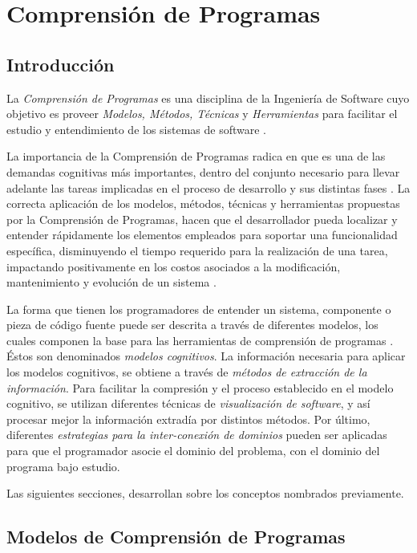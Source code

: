 \chapter{Comprensión de Programas}

\section{Introducción}

La \textit{Comprensión de Programas} es una disciplina de la Ingeniería de Software
cuyo objetivo es proveer \textit{Modelos, Métodos, Técnicas} y \textit{Herramientas}
para facilitar el estudio y entendimiento de los sistemas de software \cite{BeronHenriquesPereira10}.

La importancia de la Comprensión de Programas radica en que es una de las demandas cognitivas
más importantes, dentro del conjunto necesario para llevar adelante las tareas implicadas
en el proceso de desarrollo y sus distintas fases \cite{PetreDeQuincey06}.
La correcta aplicación de los modelos, métodos, técnicas y herramientas propuestas por
la Comprensión de Programas, hacen que el desarrollador pueda localizar y entender rápidamente
los elementos empleados para soportar una funcionalidad específica, disminuyendo el tiempo requerido
para la realización de una tarea, impactando positivamente en los costos asociados a la
modificación, mantenimiento y evolución de un sistema \cite{BeronHenriquesPereira10}.

La forma que tienen los programadores de entender un sistema, componente o pieza de código fuente
puede ser descrita a través de diferentes modelos, los cuales componen la base para las herramientas
de comprensión de programas \cite{BeronHenriquesPereiraUzal07}.
Éstos son denominados \textit{modelos cognitivos}.
La información necesaria para aplicar los modelos cognitivos, se obtiene a través de
\textit{métodos de extracción de la información}.
Para facilitar la compresión y el proceso establecido en el modelo cognitivo, se utilizan
diferentes técnicas de \textit{visualización de software}, y así procesar mejor la
información extradía por distintos métodos.
Por último, diferentes \textit{estrategias para la inter-conexión de dominios} pueden ser
aplicadas para que el programador asocie el dominio del problema, con el dominio
del programa bajo estudio.

Las siguientes secciones, desarrollan sobre los conceptos nombrados previamente.

\section{Modelos de Comprensión de Programas}

